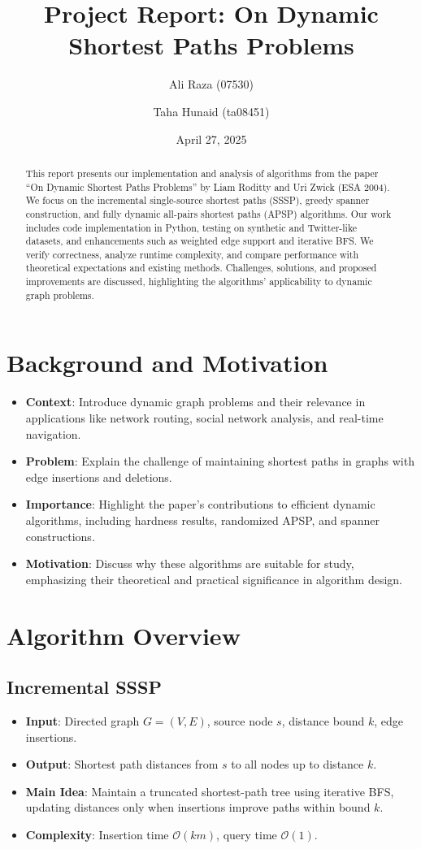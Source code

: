 \documentclass[11pt]{article}
\title{Project Report: On Dynamic Shortest Paths Problems}
\author{Ali Raza (07530) \and Taha Hunaid (ta08451)}
\date{April 27, 2025}
\begin{document}
\maketitle

\begin{abstract}
This report presents our implementation and analysis of algorithms from the paper ``On Dynamic Shortest Paths Problems'' by Liam Roditty and Uri Zwick (ESA 2004). We focus on the incremental single-source shortest paths (SSSP), greedy spanner construction, and fully dynamic all-pairs shortest paths (APSP) algorithms. Our work includes code implementation in Python, testing on synthetic and Twitter-like datasets, and enhancements such as weighted edge support and iterative BFS. We verify correctness, analyze runtime complexity, and compare performance with theoretical expectations and existing methods. Challenges, solutions, and proposed improvements are discussed, highlighting the algorithms' applicability to dynamic graph problems.
\end{abstract}

\section{Background and Motivation}
\begin{itemize}
    \item \textbf{Context}: Introduce dynamic graph problems and their relevance in applications like network routing, social network analysis, and real-time navigation.
    \item \textbf{Problem}: Explain the challenge of maintaining shortest paths in graphs with edge insertions and deletions.
    \item \textbf{Importance}: Highlight the paper's contributions to efficient dynamic algorithms, including hardness results, randomized APSP, and spanner constructions.
    \item \textbf{Motivation}: Discuss why these algorithms are suitable for study, emphasizing their theoretical and practical significance in algorithm design.
\end{itemize}

\section{Algorithm Overview}
\subsection{Incremental SSSP}
\begin{itemize}
    \item \textbf{Input}: Directed graph $G=(V,E)$, source node $s$, distance bound $k$, edge insertions.
    \item \textbf{Output}: Shortest path distances from $s$ to all nodes up to distance $k$.
    \item \textbf{Main Idea}: Maintain a truncated shortest-path tree using iterative BFS, updating distances only when insertions improve paths within bound $k$.
    \item \textbf{Complexity}: Insertion time $\mathcal{O}(km)$, query time $\mathcal{O}(1)$.
\end{itemize}
\end{document}
